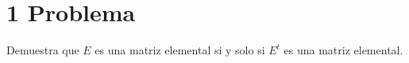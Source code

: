 \documentclass[12pt, fleqn]{article}                             %
\theoremstyle{break}                                            %
\begin{document}
\restoregeometry                                                    %
\nopagecolor                                                        %




\tableofcontents{}
\label{sec:Index}

\clearpage




\clearpage
\section{1 Problema}
        
    Demuestra que $E$ es una matriz elemental si y solo si $E^t$ es una matriz elemental.
\end{document}
